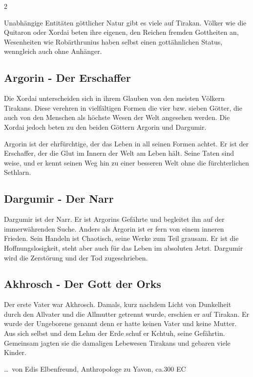 \begin{multicols}{2}
{Unabhängige Entitäten göttlicher Natur gibt es viele auf Tirakan.
Völker wie die Quitaron oder Xordai beten ihre eigenen, den Reichen fremden Gottheiten an, Wesenheiten wie Robärthrunius haben selbst einen gottähnlichen Status, wenngleich auch ohne Anhänger.


\subsection{Argorin - Der Erschaffer}\label{subsec:argorin-der-erschaffer}

Die Xordai unterscheiden sich in ihrem Glauben von den meisten Völkern Tirakans.
Diese verehren in vielfältigen Formen die vier bzw.
sieben Götter, die auch von den Menschen als höchste Wesen der Welt angesehen werden.
Die Xordai jedoch beten zu den beiden Göttern Argorin und Dargumir.

Argorin ist der ehrfürchtige, der das Leben in all seinen Formen achtet.
Er ist der Erschaffer, der die Glut im Innern der Welt am Leben hält.
Seine Taten sind weise, und er kennt seinen Weg hin zu einer besseren Welt ohne die fürchterlichen Sethlarn.


\subsection{Dargumir - Der Narr}\label{subsec:dargumir-der-narr}

Dargumir ist der Narr.
Er ist Argorins Gefährte und begleitet ihn auf der immerwährenden Suche.
Anders als Argorin ist er fern von einem inneren Frieden.
Sein Handeln ist Chaotisch, seine Werke zum Teil grausam.
Er ist die Hoffnungslosigkeit, steht aber auch für das Leben im absoluten Jetzt.
Dargumir wird die Zerstörung und der Tod zugeschrieben.

\subsection{Akhrosch - Der Gott der Orks}\label{subsec:akhrosch-der-gott-der-orks}

Der erste Vater war Akhrosch.
Damals, kurz nachdem Licht von Dunkelheit durch den Allvater und die Allmutter getrennt wurde, erschien er auf Tirakan.
Er wurde der Ungeborene genannt denn er hatte keinen Vater und keine Mutter.
Aus sich selbst und dem Lehm der Erde schuf er Kchtuh, seine Gefährtin.
Gemeinsam jagten sie die damaligen Lebewesen Tirakans und gebaren viele Kinder.

… von Edis Elbenfreund, Anthropologe zu Yavon, ca.300 EC

}
\end{multicols}
